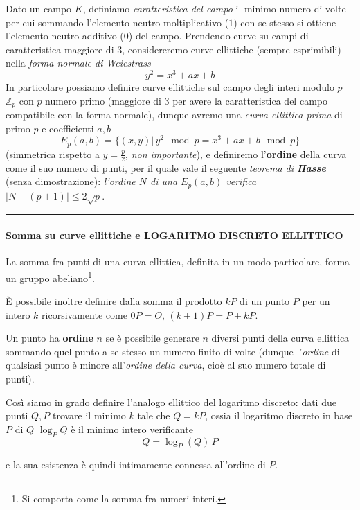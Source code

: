 \documentclass{article}
\begin{document}
Dato un campo $K$, definiamo \textit{caratteristica del campo} il minimo numero di volte per cui sommando l'elemento neutro moltiplicativo ($1$) con se stesso si ottiene l'elemento neutro additivo ($0$) del campo. Prendendo curve su campi di caratteristica maggiore di 3, considereremo curve ellittiche (sempre esprimibili) nella \emph{forma normale di Weiestrass} \[
y^2=x^3+ax+b
\]
In particolare possiamo definire curve ellittiche sul campo degli interi modulo $p$ $\mathbb{Z}_p$ con $p$ numero primo (maggiore di $3$ per avere la caratteristica del campo compatibile con la forma normale), dunque avremo una \textit{curva ellittica prima} di primo $p$ e coefficienti $a,b$
\[
E_p(a,b) = \{(x,y)|\, y^2 \mod{p} = x^3+ax+b \mod{p}\}
\]
(simmetrica rispetto a $y=\frac{p}{2}$, \textit{non importante}), e definiremo l'\textbf{ordine} della curva come il suo numero di punti, per il quale vale il seguente \textit{teorema di \textbf{Hasse}} (senza dimostrazione): \textit{l'ordine $N$ di una $E_p(a,b)$ verifica $|N-(p+1)|\le 2\sqrt{p}$}.\\
\hrule
\paragraph{Somma su curve ellittiche e LOGARITMO DISCRETO ELLITTICO}
La somma fra punti di una curva ellittica, definita in un modo particolare, forma un gruppo abeliano\footnote{Si comporta come la somma fra numeri interi.}.

\`E possibile inoltre definire dalla somma il prodotto $kP$ di un punto $P$ per un intero $k$ ricorsivamente come $0P=O,\,(k+1)P=P+kP$.

Un punto ha \textbf{ordine} $n$ se è possibile generare $n$ diversi punti della curva ellittica sommando quel punto a se stesso un numero finito di volte (dunque l'\textit{ordine} di qualsiasi punto è minore all'\textit{ordine della curva}, cioè al suo numero totale di punti).

Così siamo in grado definire l'analogo ellittico del logaritmo discreto: dati due punti $Q,P$ trovare il minimo $k$ tale che $Q=kP$, ossia il logaritmo discreto in base $P$ di $Q$ $\log_P Q$ è il minimo intero verificante
\[
Q=\log_P(Q)\, P
\]

e la sua esistenza è quindi intimamente connessa all'ordine di $P$.
\end{document}
